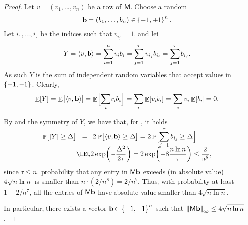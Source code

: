 \begin{proof}
    Let $v = (v_1, \ldots, v_n)$ be a row of $\mathsf{M}$. Choose a random
    \begin{equation*}
        \mathbf{b} = (b_1, \ldots, b_n) \in \left\{ {-1,+1} \right\}^n.
    \end{equation*}
    Let
    $i_1,\ldots, i_\tau$ be the indices such that $v_{i_j} =1$, and
    let
    \begin{equation*}
        Y%
        =%
        \DotProd{v}{\vecb} = \sum_{i=1}^n v_i b_i = \sum_{j=1}^\tau v_{i_j}
        b_{i_j}%
        =%
        \sum_{j=1}^\tau b_{i_j}.
    \end{equation*}
    As such $Y$ is the sum of  independent random variables that
    accept values in $\left\{ {-1,+1} \right\}$.%
      Clearly,
    \begin{equation*}
        \Ex{Y}%
        =%
        \Ex{\bigl. \DotProd{v}{\vecb}\!\ts  }%
        =%
        \Ex{\Bigl.\smash{\sum_{i}} v_i b_i} =%
        \sum_{i} \Ex{v_i b_i} = \sum_{i} v_i \Ex{b_{i}} = 0.
    \end{equation*}

    By  and the
    symmetry of $Y$, we have that, for ,
    it holds
    \begin{align*}
        \Prob{\bigl.\cardin{Y}\MakeSBig \geq \Delta} 
        &\EQ %
        2 \Prob{\bigl. \DotProd{v}{\vecb}  \geq \Delta }
        =%
        2 \Prob{\Bigl. \smash{\sum_{j=1}^\tau b_{i_j}} \geq \Delta}%
        \\
        &\LEQ%
        2 \exp \pth{ - \frac{\Delta^2}{2\tau}}
        =%
        2 \exp \pth{-8 {\frac{n\ln n}{\tau}}}%
        \leq%
        \frac{2}{n^{8}},
    \end{align*}
    since $\tau \leq n$.%
     probability that any entry in
    $\mathsf{M} \mathbf{b}$ exceeds (in absolute value) $4 \sqrt{n \ln n}$ is
    smaller than $n \cdot (2/n^8) = 2/n^7$. Thus, with probability at least $1 - 2/n^7$,
    all the entries of $\mathsf{M} \mathbf{b}$ have absolute value smaller than
    $4 \sqrt{n \ln n}$.%
    
   In particular, there exists a vector $\mathbf{b} \in \left\{ {-1,+1} \right\}^n$ such
   that $\left\| {\mathsf{M} \mathbf{b}} \right\|_\infty \leq 4 \sqrt{n \ln n}$.
\end{proof}

